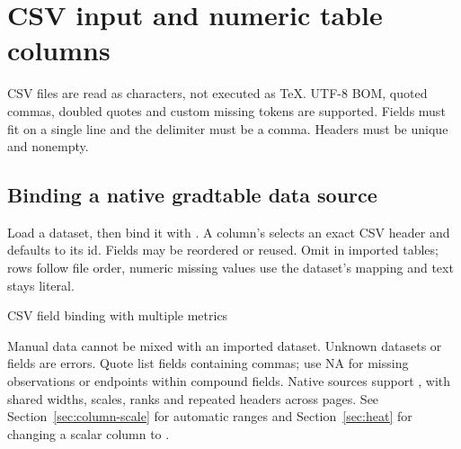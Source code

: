\section{CSV input and numeric table columns}
\label{sec:csv-input}
CSV files are read as characters, not executed as TeX. UTF-8 BOM, quoted commas,
doubled quotes and custom missing tokens are supported. Fields must fit on a
single line and the delimiter must be a comma. Headers must be unique and nonempty.
\subsection{Binding a native gradtable data source}
\label{sec:csv-native}
Load a dataset, then bind it with . A column's
 selects an exact CSV header and defaults to its id. Fields may
be reordered or reused. Omit  in imported tables; rows follow file order,
numeric missing values use the dataset's mapping and text stays literal.
\begin{demo}{CSV field binding with multiple metrics}
\begin{center}
\begin{gradtable}[align=c,header align=c,data=results,width=\linewidth,scale=column]
\end{gradtable}
\end{center}
\end{demo}
Manual  data cannot be mixed with an imported dataset. Unknown datasets
or fields are errors. Quote list fields containing commas; use NA for missing
observations or endpoints within compound fields. Native sources support
, with shared widths, scales, ranks and repeated headers across pages.
See Section~\ref{sec:column-scale} for automatic ranges and Section~\ref{sec:heat}
for changing a scalar column to .
